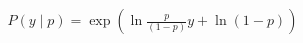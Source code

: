 \documentclass[preview]{standalone}
\begin{document}
\begin{align*}
P(y \mid p)=\exp( \ln\frac{p}{(1-p)} y + \ln(1-p) )
\end{align*}
\end{document}
